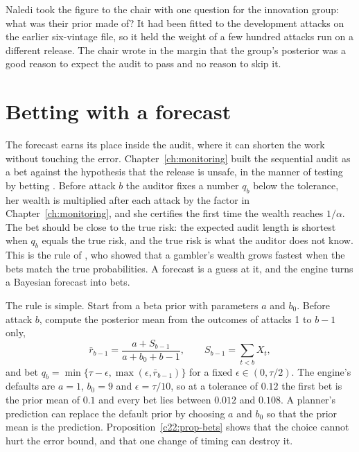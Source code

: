 Naledi took the figure to the chair with one question for the innovation group: what was their
prior made of? It had been fitted to the development attacks on the earlier six-vintage file, so it
held the weight of a few hundred attacks run on a different release. The chair wrote in the margin
that the group's posterior was a good reason to expect the audit to pass and no reason to skip it.

\section{Betting with a forecast}\label{c22:sec-betting}

The forecast earns its place inside the audit, where it can shorten the work without touching the
error. Chapter~\ref{ch:monitoring} built the sequential audit as a bet against the hypothesis that the release is
unsafe, in the manner of testing by betting \citep{shafer2021,waudbysmith2024}. Before attack $b$ the
auditor fixes a number $q_b$ below the tolerance, her wealth is multiplied after each attack by the
factor in Chapter~\ref{ch:monitoring}, and she certifies the first time the wealth reaches $1/\alpha$. The bet should be
close to the true risk: the expected audit length is shortest when $q_b$ equals the true risk, and
the true risk is what the auditor does not know. This is the rule of \citet{kelly1956}, who showed
that a gambler's wealth grows fastest when the bets match the true probabilities. A forecast is a
guess at it, and the engine turns a Bayesian forecast into bets.

The rule is simple. Start from a beta prior with parameters $a$ and $b_0$. Before attack $b$, compute
the posterior mean from the outcomes of attacks 1 to $b-1$ only,
\[\bar r_{b-1}=\frac{a+S_{b-1}}{a+b_0+b-1},\qquad S_{b-1}=\sum_{t<b}X_t,\]
and bet $q_b=\min\{\tau-\epsilon,\max(\epsilon,\bar r_{b-1})\}$ for a fixed $\epsilon\in(0,\tau/2)$. The engine's defaults are $a=1$,
$b_0=9$ and $\epsilon=\tau/10$, so at a tolerance of $0.12$ the first bet is the prior mean of $0.1$ and every bet
lies between $0.012$ and $0.108$. A planner's prediction can replace the default prior by choosing $a$
and $b_0$ so that the prior mean is the prediction. Proposition~\ref{c22:prop-bets} shows that the choice cannot hurt
the error bound, and that one change of timing can destroy it.

